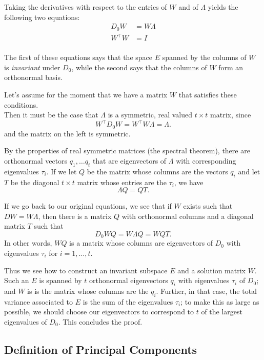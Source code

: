 \documentclass[
  11pt,
  letterpaper,
]{scrbook}
\theoremstyle{plain}
\theoremstyle{plain}
\theoremstyle{remark}
\begin{document}
Taking the derivatives with respect to the entries of \(W\) and of
\(\Lambda\) yields the following two equations: \begin{align*}
D_{0}W &= W\Lambda \\
W^{\intercal}W &= I \\
\end{align*}

The first of these equations says that the space \(E\) spanned by the
columns of \(W\) is \emph{invariant} under \(D_{0}\), while the second
says that the columns of \(W\) form an orthonormal basis.

Let's assume for the moment that we have a matrix \(W\) that satisfies
these conditions.\\
Then it must be the case that \(\Lambda\) is a symmetric, real valued
\(t\times t\) matrix, since \[
W^{\intercal}D_{0}W = W^{\intercal}W\Lambda = \Lambda.
\] and the matrix on the left is symmetric.

By the properties of real symmetric matrices (the spectral theorem),
there are orthonormal vectors \(q_{1},\ldots q_{t}\) that are
eigenvectors of \(\Lambda\) with corresponding eigenvalues \(\tau_{i}\).
If we let \(Q\) be the matrix whose columns are the vectors \(q_{i}\)
and let \(T\) be the diagonal \(t\times t\) matrix whose entries are the
\(\tau_{i}\), we have \[
\Lambda Q = QT.
\]

If we go back to our original equations, we see that if \(W\) exists
such that \(DW=W\Lambda\), then there is a matrix \(Q\) with orthonormal
columns and a diagonal matrix \(T\) such that \[
D_{0}WQ = W\Lambda Q = W Q T.
\] In other words, \(WQ\) is a matrix whose columns are eigenvectors of
\(D_{0}\) with eigenvalues \(\tau_{i}\) for \(i=1,\ldots, t\).

Thus we see how to construct an invariant subspace \(E\) and a solution
matrix \(W\). Such an \(E\) is spanned by \(t\) orthonormal eigenvectors
\(q_{i}\) with eigenvalues \(\tau_{i}\) of \(D_{0}\); and \(W\) is is
the matrix whose columns are the \(q_{i}\). Further, in that case, the
total variance associated to \(E\) is the sum of the eigenvalues
\(\tau_{i}\); to make this as large as possible, we should choose our
eigenvectors to correspond to \(t\) of the largest eigenvalues of
\(D_{0}\). This concludes the proof.

\hypertarget{definition-of-principal-components}{%
\subsection{Definition of Principal
Components}\label{definition-of-principal-components}}
\end{document}
